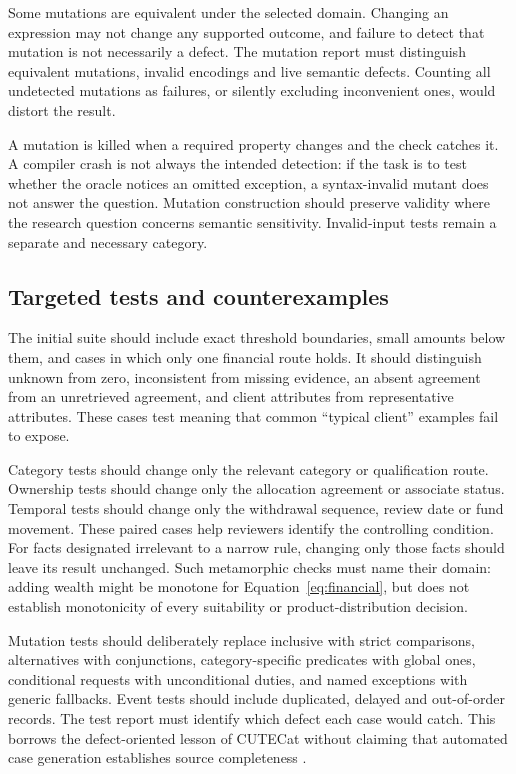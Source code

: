 Some mutations are equivalent under the selected domain. Changing an expression
may not change any supported outcome, and failure to detect that mutation is not
necessarily a defect. The mutation report must distinguish equivalent mutations,
invalid encodings and live semantic defects. Counting all undetected mutations as
failures, or silently excluding inconvenient ones, would distort the result.

A mutation is killed when a required property changes and the check catches it.
A compiler crash is not always the intended detection: if the task is to test
whether the oracle notices an omitted exception, a syntax-invalid mutant does not
answer the question. Mutation construction should preserve validity where the
research question concerns semantic sensitivity. Invalid-input tests remain a
separate and necessary category.

\subsection{Targeted tests and counterexamples}
\label{merge:P-04-prototype:05}


The initial suite should include exact threshold boundaries, small amounts below
them, and cases in which only one financial route holds. It should distinguish
unknown from zero, inconsistent from missing evidence, an absent agreement from
an unretrieved agreement, and client attributes from representative attributes.
These cases test meaning that common ``typical client'' examples fail to expose.

Category tests should change only the relevant category or qualification route.
Ownership tests should change only the allocation agreement or associate status.
Temporal tests should change only the withdrawal sequence, review date or fund
movement. These paired cases help reviewers identify the controlling condition.
For facts designated irrelevant to a narrow rule, changing only those facts should
leave its result unchanged. Such metamorphic checks must name their domain:
adding wealth might be monotone for Equation~\eqref{eq:financial}, but does not
establish monotonicity of every suitability or product-distribution decision.


Mutation tests should deliberately replace inclusive with strict comparisons,
alternatives with conjunctions, category-specific predicates with global ones,
conditional requests with unconditional duties, and named exceptions with generic
fallbacks. Event tests should include duplicated, delayed and out-of-order records.
The test report must identify which defect each case would catch. This borrows
the defect-oriented lesson of CUTECat without claiming that automated case
generation establishes source completeness \citep{cutecat2025}.

